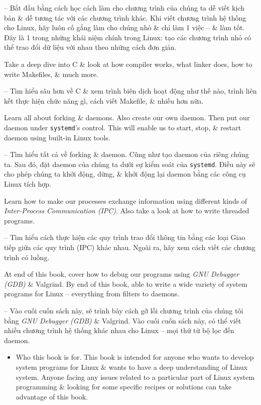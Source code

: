 \documentclass{article}
\begin{document}
\begin{itemize}
    -- Bắt đầu bằng cách học cách làm cho chương trình của chúng ta dễ viết kịch bản \& dễ tương tác với các chương trình khác. Khi viết chương trình hệ thống cho Linux, hãy luôn cố gắng làm cho chúng nhỏ \& chỉ làm 1 việc -- \& làm tốt. Đây là 1 trong những khái niệm chính trong Linux: tạo các chương trình nhỏ có thể trao đổi dữ liệu với nhau theo những cách đơn giản.
    
    Take a deep dive into C \& look at how compiler works, what linker does, how to write Makefiles, \& much more.
    
    -- Tìm hiểu sâu hơn về C \& xem trình biên dịch hoạt động như thế nào, trình liên kết thực hiện chức năng gì, cách viết Makefile, \& nhiều hơn nữa.
    
    Learn all about forking \& daemons. Also create our own daemon. Then put our daemon under {\tt systemd}'s control. This will enable us to start, stop, \& restart daemon using built-in Linux tools.
    
    -- Tìm hiểu tất cả về forking \& daemon. Cũng như tạo daemon của riêng chúng ta. Sau đó, đặt daemon của chúng ta dưới sự kiểm soát của {\tt systemd}. Điều này sẽ cho phép chúng ta khởi động, dừng, \& khởi động lại daemon bằng các công cụ Linux tích hợp.
    
    Learn how to make our processes exchange information using different kinds of {\it Inter-Process Communication (IPC)}. Also take a look at how to write threaded programs.
    
    -- Tìm hiểu cách thực hiện các quy trình trao đổi thông tin bằng các loại Giao tiếp giữa các quy trình (IPC) khác nhau. Ngoài ra, hãy xem cách viết các chương trình có luồng.
    
    At end of this book, cover how to debug our programs using {\it GNU Debugger (GDB)} \& Valgrind. By end of this book, able to write a wide variety of system programs for Linux -- everything from filters to daemons.
    
    -- Vào cuối cuốn sách này, sẽ trình bày cách gỡ lỗi chương trình của chúng tôi bằng {\it GNU Debugger (GDB)} \& Valgrind. Vào cuối cuốn sách này, có thể viết nhiều chương trình hệ thống khác nhau cho Linux -- mọi thứ từ bộ lọc đến daemon.
    \begin{itemize}
        \item {\sf Who this book is for.} This book is intended for anyone who wants to develop system programs for Linux \& wants to have a deep understanding of Linux system. Anyone facing any issues related to a particular part of Linux system programming \& looking for some specific recipes or solutions can take advantage of this book.
        

\end{itemize}
\end{itemize}
\end{document}
